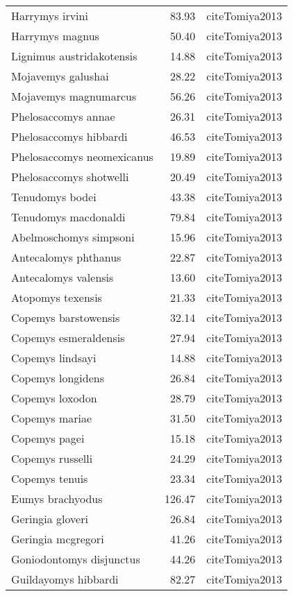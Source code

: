 \begin{table}[ht]
\begin{tabular}{lrl}
  Harrymys irvini & 83.93 & cite{Tomiya2013} \\ 
  Harrymys magnus & 50.40 & cite{Tomiya2013} \\ 
  Lignimus austridakotensis & 14.88 & cite{Tomiya2013} \\ 
  Mojavemys galushai & 28.22 & cite{Tomiya2013} \\ 
  Mojavemys magnumarcus & 56.26 & cite{Tomiya2013} \\ 
  Phelosaccomys annae & 26.31 & cite{Tomiya2013} \\ 
  Phelosaccomys hibbardi & 46.53 & cite{Tomiya2013} \\ 
  Phelosaccomys neomexicanus & 19.89 & cite{Tomiya2013} \\ 
  Phelosaccomys shotwelli & 20.49 & cite{Tomiya2013} \\ 
  Tenudomys bodei & 43.38 & cite{Tomiya2013} \\ 
  Tenudomys macdonaldi & 79.84 & cite{Tomiya2013} \\ 
  Abelmoschomys simpsoni & 15.96 & cite{Tomiya2013} \\ 
  Antecalomys phthanus & 22.87 & cite{Tomiya2013} \\ 
  Antecalomys valensis & 13.60 & cite{Tomiya2013} \\ 
  Atopomys texensis & 21.33 & cite{Tomiya2013} \\ 
  Copemys barstowensis & 32.14 & cite{Tomiya2013} \\ 
  Copemys esmeraldensis & 27.94 & cite{Tomiya2013} \\ 
  Copemys lindsayi & 14.88 & cite{Tomiya2013} \\ 
  Copemys longidens & 26.84 & cite{Tomiya2013} \\ 
  Copemys loxodon & 28.79 & cite{Tomiya2013} \\ 
  Copemys mariae & 31.50 & cite{Tomiya2013} \\ 
  Copemys pagei & 15.18 & cite{Tomiya2013} \\ 
  Copemys russelli & 24.29 & cite{Tomiya2013} \\ 
  Copemys tenuis & 23.34 & cite{Tomiya2013} \\ 
  Eumys brachyodus & 126.47 & cite{Tomiya2013} \\ 
  Geringia gloveri & 26.84 & cite{Tomiya2013} \\ 
  Geringia mcgregori & 41.26 & cite{Tomiya2013} \\ 
  Goniodontomys disjunctus & 44.26 & cite{Tomiya2013} \\ 
  Guildayomys hibbardi & 82.27 & cite{Tomiya2013} \\ 

\end{tabular}
\end{table}
